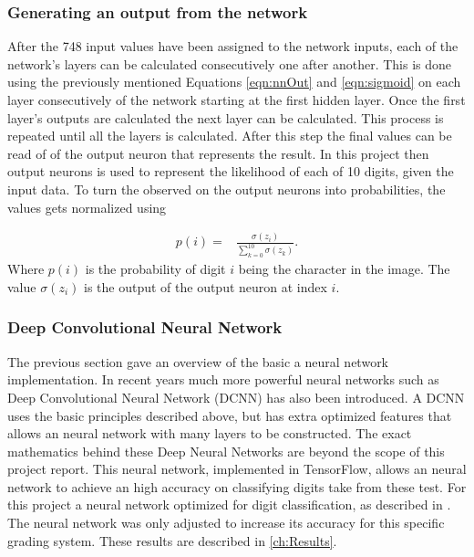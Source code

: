 \subsubsection{Generating an output from the network}
After the 748 input values have been assigned to the network inputs, each of the network's layers can be calculated consecutively one after another. This is done using the previously mentioned Equations \ref{eqn:nnOut} and \ref{eqn:sigmoid} on each layer consecutively of the network starting at the first hidden layer. Once the first layer's outputs are calculated the next layer can be calculated. This process is repeated until all the layers is calculated. After this step the final values can be read of of the output neuron that represents the result. In this project then output neurons is used to represent the likelihood of each of 10 digits, given the input data. To turn the observed on the output neurons into probabilities, the values gets normalized using


\begin{align}
  p(i) =  &\displaystyle{\frac{\sigma(z_{i})}{\sum_{k=0}^{10} \sigma(z_{k})}}.
\label{eqn:normal}
\end{align}
Where $p(i)$ is the probability of digit $i$ being the character in the image. The value $\sigma(z_{i})$ is the output of the output neuron at index $i$.

\subsubsection{Deep Convolutional Neural Network}

The previous section gave an overview of the basic a neural network implementation. In recent years much more powerful neural networks such as Deep Convolutional Neural Network (DCNN) has also been introduced. A DCNN uses the basic principles described above, but has extra optimized features that allows an neural network with many layers to be constructed. The exact mathematics behind these Deep Neural Networks are beyond the scope of this project report. This neural network, implemented in TensorFlow, allows an neural network to achieve an high accuracy on  classifying digits take from these test. For this project a neural network optimized for digit classification, as described in \citet{Tensor}. The neural network was only adjusted to increase its accuracy for this specific grading system. These results are described in \ref{ch:Results}.

